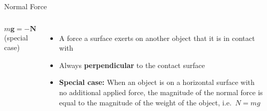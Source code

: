 \documentclass[12pt,compress,aspectratio=169]{beamer}
\begin{document}
\begin{frame}{Normal Force}
  \begin{columns}
    \centering
    
    $m\bm{g}=-\bm{N}$\\(special case)
    
    \begin{itemize}
    \item A force a surface exerts on another object that it is in contact with
    \item Always \textbf{perpendicular} to the contact surface
    \item\textbf{Special case:} When an object is on a horizontal surface
      with no additional applied force, the magnitude of the normal force is
      equal to the magnitude of the weight of the object, i.e.\ $N=mg$
    \end{itemize}
  \end{columns}
\end{frame}
\end{document}
